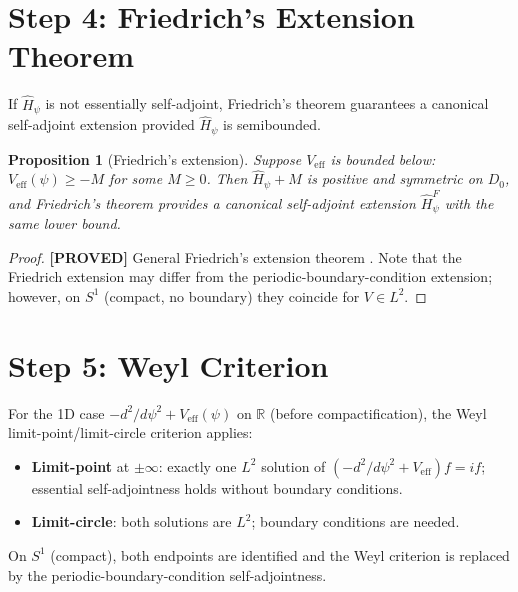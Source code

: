 \documentclass[11pt,a4paper]{article}
\newtheorem{proposition}{Proposition}
\newcommand{\proved}[1]{\textbf{[PROVED]} #1}
\begin{document}
\section{Step 4: Friedrich's Extension Theorem}

If $\hat{H}_\psi$ is not essentially self-adjoint, Friedrich's theorem
guarantees a canonical self-adjoint extension provided $\hat{H}_\psi$ is
semibounded.

\begin{proposition}[Friedrich's extension]
  Suppose $V_\mathrm{eff}$ is bounded below: $V_\mathrm{eff}(\psi) \geq -M$
  for some $M \geq 0$.  Then $\hat{H}_\psi + M$ is positive and symmetric on
  $D_0$, and Friedrich's theorem provides a canonical self-adjoint extension
  $\hat{H}^F_\psi$ with the same lower bound.
\end{proposition}

\begin{proof}
  \proved{General Friedrich's extension theorem \cite[Thm.\ X.23]{ReedSimon2}.}
  Note that the Friedrich extension may differ from the periodic-boundary-condition
  extension; however, on $S^1$ (compact, no boundary) they coincide for
  $V \in L^2$.
\end{proof}

\section{Step 5: Weyl Criterion}

For the 1D case $-d^2/d\psi^2 + V_\mathrm{eff}(\psi)$ on $\mathbb{R}$ (before
compactification), the Weyl limit-point/limit-circle criterion applies:

\begin{itemize}
  \item \textbf{Limit-point} at $\pm\infty$: exactly one $L^2$ solution of
        $(-d^2/d\psi^2 + V_\mathrm{eff})f = if$; essential self-adjointness holds
        without boundary conditions.
  \item \textbf{Limit-circle}: both solutions are $L^2$; boundary conditions
        are needed.
\end{itemize}

On $S^1$ (compact), both endpoints are identified and the Weyl criterion is
replaced by the periodic-boundary-condition self-adjointness.
\end{document}
